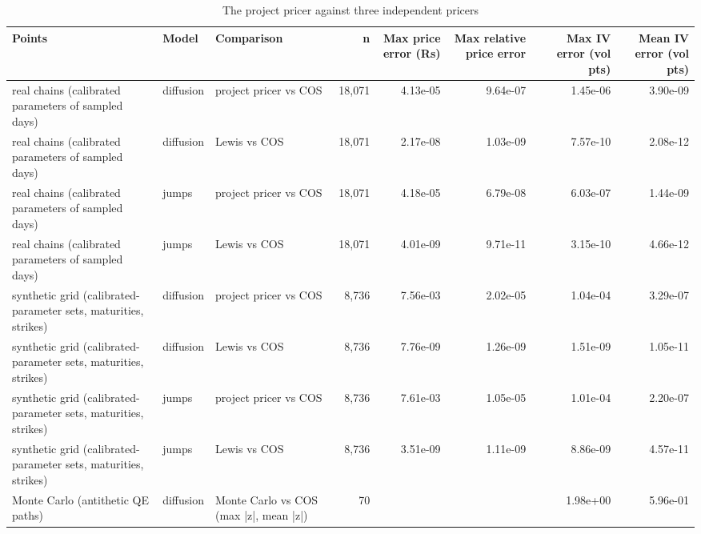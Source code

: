 \begin{table}[ht]
\centering
\small
\caption{The project pricer against three independent pricers}
\begin{tabular}{lllrrrrr}
\toprule
Points & Model & Comparison & n & Max price error (Rs) & Max relative price error & Max IV error (vol pts) & Mean IV error (vol pts) \\
\midrule
real chains (calibrated parameters of sampled days) & diffusion & project pricer vs COS & 18,071 & 4.13e-05 & 9.64e-07 & 1.45e-06 & 3.90e-09 \\
real chains (calibrated parameters of sampled days) & diffusion & Lewis vs COS & 18,071 & 2.17e-08 & 1.03e-09 & 7.57e-10 & 2.08e-12 \\
real chains (calibrated parameters of sampled days) & jumps & project pricer vs COS & 18,071 & 4.18e-05 & 6.79e-08 & 6.03e-07 & 1.44e-09 \\
real chains (calibrated parameters of sampled days) & jumps & Lewis vs COS & 18,071 & 4.01e-09 & 9.71e-11 & 3.15e-10 & 4.66e-12 \\
synthetic grid (calibrated-parameter sets, maturities, strikes) & diffusion & project pricer vs COS & 8,736 & 7.56e-03 & 2.02e-05 & 1.04e-04 & 3.29e-07 \\
synthetic grid (calibrated-parameter sets, maturities, strikes) & diffusion & Lewis vs COS & 8,736 & 7.76e-09 & 1.26e-09 & 1.51e-09 & 1.05e-11 \\
synthetic grid (calibrated-parameter sets, maturities, strikes) & jumps & project pricer vs COS & 8,736 & 7.61e-03 & 1.05e-05 & 1.01e-04 & 2.20e-07 \\
synthetic grid (calibrated-parameter sets, maturities, strikes) & jumps & Lewis vs COS & 8,736 & 3.51e-09 & 1.11e-09 & 8.86e-09 & 4.57e-11 \\
Monte Carlo (antithetic QE paths) & diffusion & Monte Carlo vs COS (max |z|, mean |z|) & 70 &  &  & 1.98e+00 & 5.96e-01 \\
\bottomrule
\end{tabular}
\par{}
\end{table}
